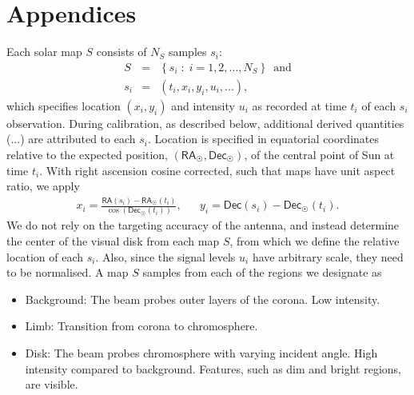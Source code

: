 \documentclass{aa}
\newcommand{\eqnl}[2]{\begin{eqnarray}\label{#1}#2\end{eqnarray}}
\newcommand{\RA}{{\mathsf{RA}}}
\newcommand{\Dec}{{\mathsf{Dec}}}
\begin{document}
\FloatBarrier

\section{Appendices}

  Each solar map $S$ consists of $N_S$ samples $s_i$:
  \eqnl{radio_sample}{
    S &=& \left\{ s_i \;:\; i = 1, 2, ..., N_S \right\}\,\text{ and}\nonumber\\
    s_i &=& \left( t_i, x_i, y_i, u_i, ... \right),
  }
which specifies location $(x_i,y_i)$ and intensity $u_i$ as recorded at time
$t_i$ of each $s_i$ observation.
During calibration, as described below, additional derived quantities ($...$)
are attributed to each $s_i$.
Location is specified in equatorial coordinates relative to the expected
position, $(\RA_{\astrosun}, \Dec_{\astrosun})$, of the central point of Sun
at time $t_i$.
With right ascension cosine corrected, such that maps have unit aspect ratio, we apply 
\eqnl{relative_radec}{
  x_i = \frac{\RA(s_i)
      - \RA_{\astrosun}(t_i)}{\cos \left( \Dec_{\astrosun}(t_i) \right)}, &&
  y_i = \Dec(s_i) - \Dec_{\astrosun}(t_i)\text{.}
  }
  We do not rely on the targeting accuracy of the antenna, and instead
  determine the center of the visual disk from each map $S$, from which we
  define the relative location of each $s_i$.
  Also, since the signal levels $u_i$ have arbitrary scale, 
  they need to be normalised.
  A map $S$ samples from each of the regions we designate as
  \begin{itemize}
  \item Background: The beam probes outer layers of the corona. Low intensity.
  \item Limb: Transition from corona to chromosphere.
  \item Disk: The beam probes chromosphere with varying incident angle. High intensity compared to background. Features, such as dim and bright regions, are visible.
  \end{itemize}
\end{document}
